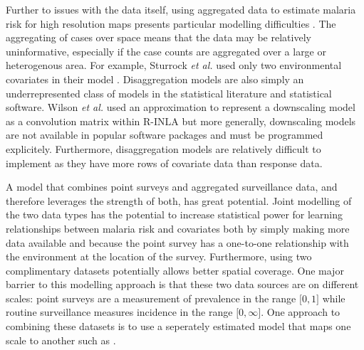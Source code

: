 \documentclass[10pt,letterpaper]{article}
\begin{document}

Further to issues with the data itself, using aggregated data to estimate malaria risk for high resolution maps presents particular modelling difficulties \cite{sturrock2014fine, wilson2017pointless, law2018variational, taylor2017continuous, li2012log}.
The aggregating of cases over space means that the data may be relatively uninformative, especially if the case counts are aggregated over a large or heterogenous area.
For example, Sturrock \emph{et al.} used only two environmental covariates in their model \cite{sturrock2014fine}.
Disaggregation models are also simply an underrepresented class of models in the statistical literature and statistical software.
Wilson \emph{et al.} \cite{wilson2017pointless} used an approximation to represent a downscaling model as a convolution matrix within R-INLA \cite{INLA} but more generally, downscaling models are not available in popular software packages and must be programmed explicitely.
Furthermore, disaggregation models are relatively difficult to implement as they have more rows of covariate data than response data.


A model that combines point surveys and aggregated surveillance data, and therefore leverages the strength of both, has great potential.
Joint modelling of the two data types has the potential to increase statistical power for learning relationships between malaria risk and covariates both by simply making more data available and because the point survey has a one-to-one relationship with the environment at the location of the survey.
Furthermore, using two complimentary datasets potentially allows better spatial coverage. 
One major barrier to this modelling approach is that these two data sources are on different scales: point surveys are a measurement of prevalence in the range $\lbrack 0, 1\rbrack$ while routine surveillance measures incidence in the range $\lbrack 0, \infty\rbrack$.
One approach to combining these datasets is to use a seperately estimated model that maps one scale to another such as \cite{cameron2015defining}.
\end{document}

